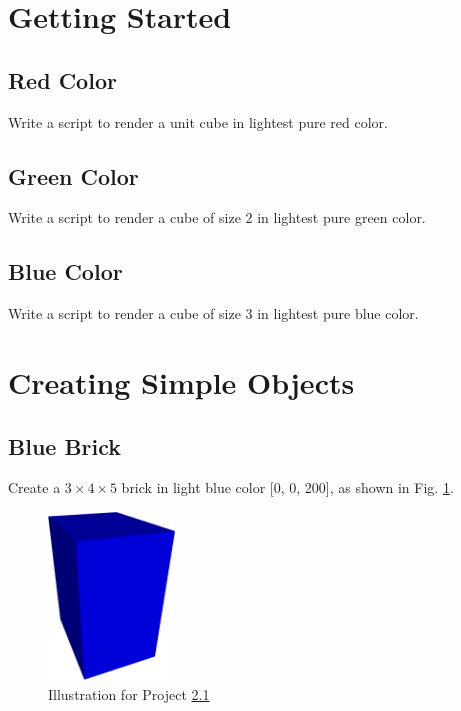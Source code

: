 
\section{Getting Started}

\subsection{Red Color}
Write a script to render a unit cube in lightest pure red color.

\subsection{Green Color}
Write a script to render a cube of size 2 in lightest pure green color.

\subsection{Blue Color}
Write a script to render a cube of size 3 in lightest pure blue color.

\section{Creating Simple Objects}

\subsection{Blue Brick}\label{2.1}
Create a $3 \times 4 \times 5$ brick in light
blue color [0, 0, 200], as shown in Fig. \ref{fig:a1}.

\begin{figure}[!ht]
\begin{center}
\includegraphics[width=0.3\textwidth]{img/a1-blue-brick.png}
\end{center}
\vspace{-2mm}
\caption{Illustration for Project \ref{2.1}}
\label{fig:a1}
\end{figure}


